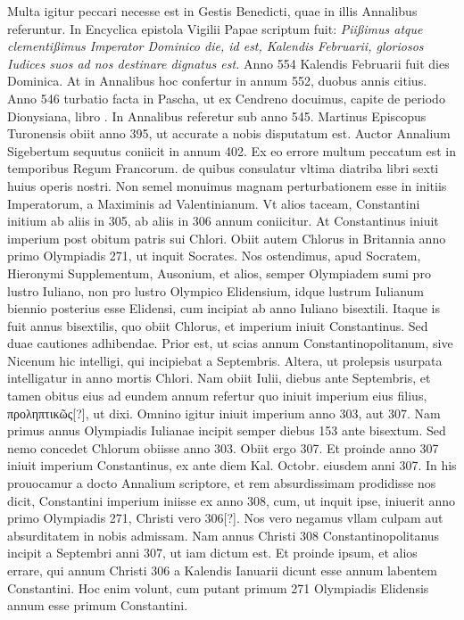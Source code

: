 Multa igitur peccari necesse est
in Gestis Benedicti, quae in illis Annalibus referuntur.
In Encyclica
epistola Vigilii Papae scriptum fuit: \textit{Piißimus atque clementißimus
Imperator Dominico die, id est, Kalendis Februarii, gloriosos Iudices suos
ad nos destinare dignatus est.}
Anno 554 Kalendis Februarii fuit dies
Dominica.
At in Annalibus hoc confertur in annum 552, duobus
annis citius.
Anno 546 turbatio facta in Pascha, ut ex Cendreno docuimus,
capite de periodo Dionysiana, libro .
In Annalibus referetur
sub anno 545.
Martinus Episcopus Turonensis obiit anno
395, ut accurate a nobis disputatum est.
Auctor Annalium Sigebertum
sequutus coniicit in annum 402.
Ex eo errore multum peccatum
est in temporibus Regum Francorum.
de quibus consulatur vltima
diatriba libri sexti huius operis nostri.
Non semel monuimus magnam
perturbationem esse in initiis Imperatorum, a Maximinis
ad Valentinianum.
Vt alios taceam, Constantini initium ab aliis in
305, ab aliis in 306 annum coniicitur.
At Constantinus iniuit imperium
post obitum patris sui Chlori.
Obiit autem Chlorus in Britannia
anno primo Olympiadis 271, ut inquit Socrates.
Nos ostendimus,
apud Socratem, Hieronymi Supplementum, Ausonium, et alios,
semper Olympiadem sumi pro lustro Iuliano, non pro lustro Olympico
Elidensium, idque lustrum Iulianum biennio posterius esse Elidensi,
cum incipiat ab anno Iuliano bisextili.
Itaque is fuit annus bisextilis,
quo obiit Chlorus, et imperium iniuit Constantinus.
Sed duae
cautiones adhibendae.
Prior est, ut scias annum Constantinopolitanum,
sive Nicenum hic intelligi, qui incipiebat a  Septembris.
Altera, ut prolepsis usurpata intelligatur in anno mortis Chlori.
Nam obiit  Iulii,  diebus ante
 Septembris, et
tamen obitus eius ad eundem annum refertur quo iniuit imperium
eius filius, \textgreek{προληπτικῶς[?]}, ut dixi.
Omnino igitur iniuit imperium anno
303, aut 307.
Nam primus annus Olympiadis Iulianae incipit semper
diebus 153 ante bisextum.
Sed nemo concedet Chlorum obiisse
anno 303.
Obiit ergo 307.
Et proinde anno 307 iniuit imperium
Constantinus, ex ante diem  Kal. Octobr. eiusdem anni 307.
In his prouocamur a docto Annalium scriptore, et rem absurdissimam
prodidisse nos dicit, Constantini imperium iniisse ex anno
308, cum, ut inquit ipse, iniuerit anno primo Olympiadis 271,
Christi vero 306[?].
Nos vero negamus vllam culpam aut absurditatem
in nobis admissam.
Nam annus Christi 308 Constantinopolitanus
incipit a Septembri anni 307, ut iam dictum est.
Et proinde ipsum, et alios errare, qui annum Christi 306 a
 Kalendis Ianuarii
dicunt esse annum labentem Constantini.
Hoc enim volunt,
cum putant primum 271 Olympiadis Elidensis annum esse primum
Constantini.

